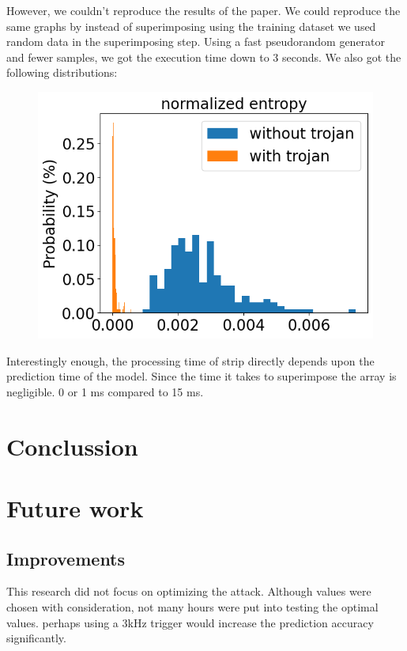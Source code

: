 \documentclass{report}
\theoremstyle{definition}
\theoremstyle{remark}
\begin{document}
However, we couldn't reproduce the results of the paper. We could reproduce the same graphs by instead of superimposing using the training dataset we used random data in the superimposing step. Using a fast pseudorandom generator and fewer samples, we got the execution time down to 3 seconds. We also got the following distributions:
\begin{figure}
    \includegraphics[scale=0.5]{img/prop.png}
\end{figure}

Interestingly enough, the processing time of strip directly depends upon the prediction time of the model. Since the time it takes to superimpose the array is negligible. 0 or 1 ms compared to 15 ms. 
\chapter{Conclussion}
\chapter{Future work}
\section{Improvements}
This research did not focus on optimizing the attack. Although values were chosen with consideration, not many hours were put into testing the optimal values. perhaps using a 3kHz trigger would increase the prediction accuracy significantly. 
\newpage


\end{document}
